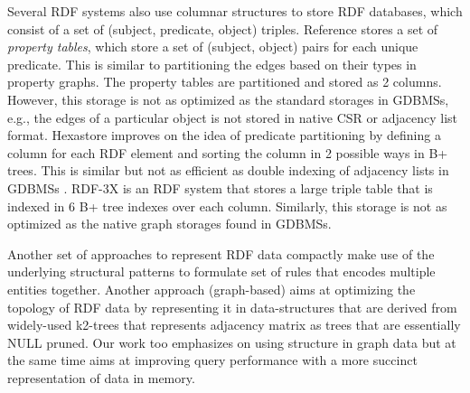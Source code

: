 Several RDF systems also use columnar structures to store RDF databases, which consist of a set of (subject, predicate, object) triples. Reference \cite{rdf-vertical}
stores a set of \emph{property tables}, which store a set of (subject, object) pairs for each unique predicate. This is similar to partitioning the edges based on their types in property graphs. The property tables are partitioned and stored as 2 columns. However, this storage is not as optimized as the standard storages in GDBMSs, e.g., the edges of a particular object is not stored in native CSR or adjacency list format.  Hexastore \cite{hexastore} improves on the idea of predicate partitioning by defining a column for each RDF element  and sorting the column in 2 possible ways in B+ trees. This is similar but not as efficient as double indexing of adjacency lists in GDBMSs . RDF-3X \cite{rdf-3x} is an RDF system that stores a large triple table that is indexed in 6 B+ tree indexes over each column. Similarly, this storage is not as optimized as the native graph storages found in GDBMSs.

Another set of approaches \cite{comp-rdf, rbcomp, hdt} to represent RDF data compactly make use of the underlying structural patterns to formulate set of rules that encodes multiple entities together. Another approach (graph-based) aims at optimizing the topology of RDF data \cite{k2triples, ik2trees} by representing it in data-structures that are derived from widely-used k2-trees \cite{k2trees} that represents adjacency matrix as trees that are essentially NULL pruned. Our work too emphasizes on using structure in graph data but at the same time aims at improving query performance with a more succinct representation of data in memory.  

